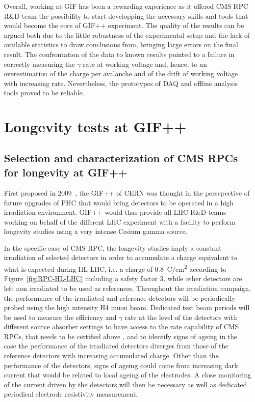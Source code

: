 	Overall, working at GIF has been a rewarding experience as it offered CMS RPC R\&D team the possibility to start developping the necessary skills and tools that would become the core of GIF++ experiment. The quality of the results can be argued both due to the little robustness of the experimental setup and the lack of available statistics to draw conclusions from, bringing large errors on the final result. The confrontation of the data to known results pointed to a failure in correctly measuring the $\gamma$ rate at working voltage and, hence, to an overestimation of the charge per avalanche and of the drift of working voltage with increasing rate. Nevertheless, the prototypes of DAQ and offline analysis tools proved to be reliable.

\section{Longevity tests at \acs{GIF++}}
\label{chapt5:sec:GIFpptests}

	\subsection{Selection and characterization of CMS RPCs for longevity at GIF++}
	\label{chapt5:ssec:selection}

	First proposed in 2009~\cite{GIF++2009}, the \acl{GIF++} of CERN was thought in the perscpective of future upgrades of PHC that would bring detectors to be operated in a high irradiation environment. GIF++ would thus provide all LHC R\&D teams working on behalf of the different LHC experiment with a facility to perform longevity studies using a very intense Cesium gamma source.
	
	In the specific case of CMS RPC, the longevity studies imply a constant irradiation of selected detectors in order to accumulate a charge equivalent to what is expected during HL-LHC, i.e. a charge of \SI{0.8}{C/cm^2} according to Figure~\ref{fig:RPC-HL-LHC} including a safety factor 3, while other detectors are left non irradiated to be used as references. Throughout the irradiation campaign, the performance of the irradiated and reference detectors will be periodically probed using the high intensity H4 muon beam. Dedicated test beam periods will be used to measure the efficiency and $\gamma$ rate at the level of the detectors with different source absorber settings to have access to the rate capability of CMS RPCs, that needs to be certified above , and to identify signs of ageing in the case the performance of the irradiated detectors diverges from those of the reference detectors with increasing accumulated charge. Other than the performance of the detectors, signs of ageing could come from increasing dark current that would be related to local ageing of the electrodes. A close monitoring of the current driven by the detectors will then be necessary as well as dedicated periodical electrode resistivity measurement.
	
